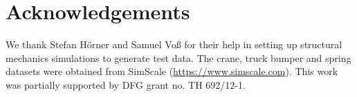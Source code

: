 
%
\section*{Acknowledgements} %
\label{sec:tcl_acknowledgements}
%
We thank Stefan H\"orner and Samuel Vo{\ss} for their help in setting up
structural mechanics simulations to generate test data.
%
The crane, truck bumper and spring datasets were obtained from SimScale
(\url{https://www.simscale.com}).
%
This work was partially supported by DFG grant no. TH 692/12-1.
%
